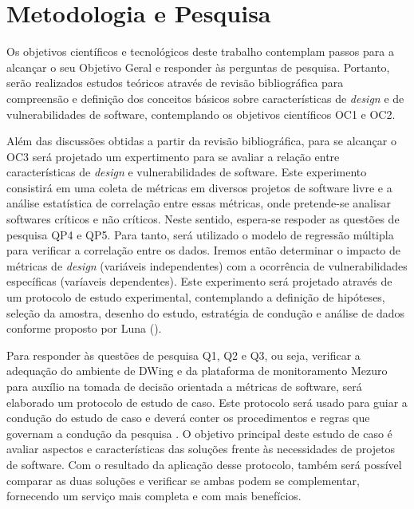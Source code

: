 





\section{Metodologia e Pesquisa}

%

Os objetivos científicos e tecnológicos deste trabalho contemplam passos para a alcançar o seu Objetivo Geral e responder às perguntas de pesquisa. Portanto, serão realizados estudos teóricos através de revisão bibliográfica para compreensão e definição dos conceitos básicos sobre características de \emph{design}  e de vulnerabilidades de software, contemplando os objetivos científicos OC1 e OC2.

%

Além das discussões obtidas a partir da revisão bibliográfica, para se alcançar o OC3 será projetado um expertimento para se avaliar a relação entre características de \emph{design} e vulnerabilidades de software. Este experimento consistirá em uma coleta de métricas em diversos projetos de software livre e a análise estatística de correlação entre essas métricas, onde pretende-se analisar softwares críticos e não críticos. Neste sentido, espera-se respoder as questões de pesquisa QP4 e QP5. Para tanto, será utilizado o modelo de regressão múltipla para verificar a correlação entre os dados. Iremos então determinar o impacto de métricas de \emph{design} (variáveis independentes) com a ocorrência de  vulnerabilidades específicas (varíaveis dependentes). Este experimento será projetado através de um protocolo de estudo experimental, contemplando a definição de hipóteses, seleção da amostra, desenho do estudo, estratégia de condução e análise de dados conforme proposto por Luna (\citeyear{luna1998}).

%

Para responder às questões de pesquisa Q1, Q2 e Q3, ou seja, verificar a adequação do ambiente de DWing e da plataforma de monitoramento Mezuro para auxílio na tomada de decisão orientada a métricas de software, será elaborado um protocolo de estudo de caso. Este protocolo será usado para guiar a condução do estudo de caso e deverá conter os procedimentos e regras que governam a condução da pesquisa \cite{miles1994}. O objetivo principal deste estudo de caso é avaliar aspectos e características das soluções frente às necessidades de projetos de software. Com o resultado da aplicação desse protocolo, também será possível comparar as duas soluções e verificar se ambas podem se complementar, fornecendo um serviço mais completa e com mais benefícios.

